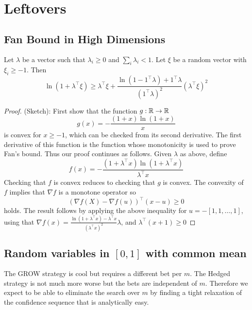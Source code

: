 \section{Leftovers}
\subsection{Fan Bound in High Dimensions}
Let $\lambda$ be a vector such that $\lambda_i \geq 0$ and
$\sum_i \lambda_i < 1$. Let $\xi$ be a random vector with
$\xi_i \geq -1$. Then
\[
\ln(1+\lambda^\top \xi) \geq \lambda^\top \xi + \frac{\ln(1-1^\top \lambda) +1^\top \lambda}{(1^\top \lambda)^2} (\lambda^\top \xi)^2
\]
\begin{proof}
(Sketch): First show that the function $g:\mathbb{R}\to\mathbb{R}$
\[
g(x) = -\frac{(1+x)\ln(1+x)}{x}
\]
is convex for $x\geq -1$, which can be checked from its second derivative.
The first derivative of this function is the function
whose monotonicity is used to prove Fan's bound. Thus
our proof continues as follows. Given $\lambda$ as above,
define  
\[
f(x) = -\frac{(1+\lambda^\top x)\ln(1+\lambda^\top x)}{\lambda^\top x}
\]
Checking that $f$ is convex reduces to checking that $g$ is convex.
The convexity of $f$ implies that $\nabla f$ is a monotone operator so
\[
(\nabla f(X) - \nabla f(u))^\top (x-u) \geq 0
\]
holds. The result follows by applying the above inequality for 
$u=-[1,1,\ldots,1]$, using that $\nabla f(x)=\frac{\ln(1+\lambda^\top x)-\lambda^\top x}{(\lambda^\top x)^2}\lambda$, and $\lambda^\top (x+1)\geq 0$
\end{proof}


\subsection{Random variables in $[0,1]$ with common mean}
\label{app:nogrid01}
The GROW strategy is cool but requires a different bet per $m$.
The Hedged strategy is not much more worse but the bets are 
independent of $m$. Therefore we expect to be able to eliminate
the search over $m$ by finding a tight relaxation of the 
confidence sequence that is analytically easy.

